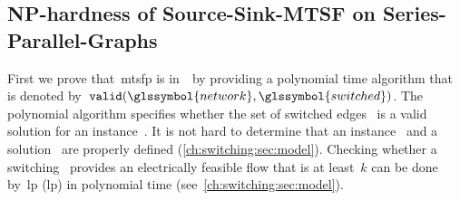 \subsection{NP-hardness of Source-Sink-MTSF on Series-Parallel-Graphs}
\label{ch:switching:sec:complexity:subsec:np_hardness_Source_Sink_MTSF_capacity1}
% 
First we prove that~\gls{mtsfp} is in~\NP\ by providing a polynomial time
algorithm that is denoted by~$\mathtt{valid}(\glssymbol{network},
\glssymbol{switched})$. The polynomial algorithm specifies whether the set of
switched edges~ is a valid solution for an
instance~. It is not hard to determine that an
instance~ and a solution~ are properly
defined (\cref{ch:switching:sec:model}). Checking whether a
switching~ provides an electrically feasible flow that is at
least~$k$ can be done by~\acrlong{lp} (\gls{lp}) in polynomial time
(see~\cref{ch:switching:sec:model}).

